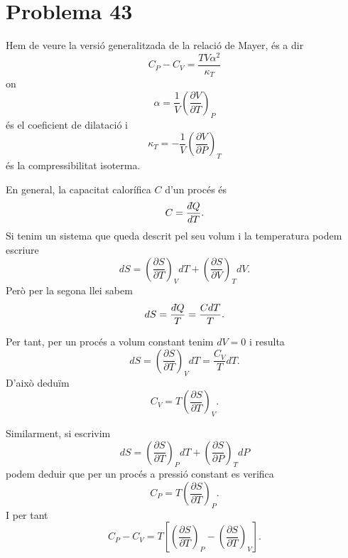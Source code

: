 \documentclass[12pt]{article}
\newcommand{\dif}[3]{\left(\frac{\partial #1}{\partial #2}\right)_#3 \! d#2 + \left(\frac{\partial #1}{\partial #3}\right)_#2 \! d#3}
\newcommand{\dbar}{d\hspace*{-0.08em}\bar{}\hspace*{0.1em}}
\begin{document}
\section{Problema 43}
Hem de veure la versió generalitzada de la relació de Mayer, és a dir
\begin{equation*}
	C_P - C_V = \frac{TV\alpha^2}{\kappa_T}
\end{equation*}
on 
\begin{equation} \label{eq:coef de dilatacio}
	\alpha = \frac{1}{V} \left(\frac{\partial V}{\partial T}\right)_P
\end{equation}
és el coeficient de dilatació i 
\begin{equation} \label{eq:compressibilitat}
	\kappa_T = - \frac{1}{V} \left(\frac{\partial V}{\partial P}\right)_T
\end{equation}
és la compressibilitat isoterma.

En general, la capacitat calorífica \( C \) d'un procés és 
\begin{equation*}
	C = \frac{\dbar Q}{dT}.
\end{equation*}
Si tenim un sistema que queda descrit pel seu volum i la temperatura podem escriure
\begin{equation} \label{eq:dS amb T i V}
	dS = \dif{S}{T}{V}. 
\end{equation}
Però per la segona llei sabem
\begin{equation*}
	dS = \frac{\dbar Q}{T} = \frac{C dT}{T}.
\end{equation*}

Per tant, per un procés a volum constant tenim \( dV = 0 \) i resulta
\begin{equation*}
	dS = \left(\dfrac{\partial S}{\partial T}\right)_V dT = \frac{C_V}{T} dT.
\end{equation*}
D'això deduïm 
\begin{equation*}
	C_V = T \left(\dfrac{\partial S}{\partial T}\right)_V.
\end{equation*}

Similarment, si escrivim
\begin{equation*}
	dS = \dif{S}{T}{P}
\end{equation*}
podem deduir que per un procés a pressió constant es verifica
\begin{equation*}
	C_P = T \left(\dfrac{\partial S}{\partial T}\right)_P.
\end{equation*}
I per tant
\begin{equation*}
	C_P - C_V = T \left[ \left(\dfrac{\partial S}{\partial T}\right)_P - \left(\dfrac{\partial S}{\partial T}\right)_V \right].
\end{equation*}
\end{document}
